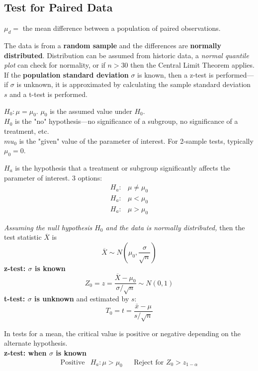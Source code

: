 \documentclass[]{article}
\newenvironment{definitions}{
	\begin{description}[font=\sffamily\bfseries, leftmargin=1cm, style=nextline]
	}{
	\end{description}
}
\begin{document}
\subsection{Test for Paired Data}
\begin{definitions}
	\item[Parameter of interest]
	$\mu_d = $ the mean difference between a population of paired observations.
	\item[Required assumptions]
	The data is from a \textbf{random sample} and the differences are \textbf{normally distributed}. Distribution can be assumed from historic data, a \emph{normal quantile plot} can check for normality, or if $n>30$ then the Central Limit Theorem applies. If the \textbf{population standard deviation} $\sigma$ is known, then a z-test is performed---if $\sigma$ is unknown, it is approximated by calculating the sample standard deviation $s$ and a t-test is performed.
	\item[Null Hypothesis]
	$H_0: \mu = \mu_0$. $\mu_0$ is the assumed value under $H_0$.\\
	$H_0$ is the "no" hypothesis---no significance of a subgroup, no significance of a treatment, etc.\\
	$mu_0$ is the "given" value of the parameter of interest. For 2-sample tests, typically $\mu_0 = 0$.
	\item[Alternate Hypothesis]
	$H_a$ is the hypothesis that a treatment or subgroup significantly affects the parameter of interest.
	3 options:
	\begin{align*}
		H_a:& \mu \neq \mu_0\\
		H_a:& \mu < \mu_0\\
		H_a:& \mu > \mu_0
	\end{align*} 
	\item[Test statistic]
	\emph{Assuming the null hypothesis $H_0$ and the data is normally distributed,} then the test statistic $\overline{X}$ is
	\[ \overline{X} \sim N(\mu_0, \frac{\sigma}{\sqrt{n}}) \]
	\textbf{z-test: $\sigma$ is known}
	\[ Z_0 = z = \frac{\overline{X} - \mu_0}{\sigma / \sqrt{n}} \sim N(0,1) \]
	\textbf{t-test: $\sigma$ is unknown} and estimated by $s$:
	\[ T_0 = t = \frac{\bar{x} - \mu}{s / \sqrt{n}}\]
	\item[Rejection Criteria -- critical value]
	In tests for a mean, the critical value is positive or negative depending on the alternate hypothesis.\\
	\textbf{z-test: when $\sigma$ is known}
	\[
	\begin{array}{llcl}
		\text{Positive} & H_a: \mu > \mu_0 && \text{Reject for } Z_0 > z_{1-\alpha}\\

\end{array}\]
\end{definitions}
\end{document}
